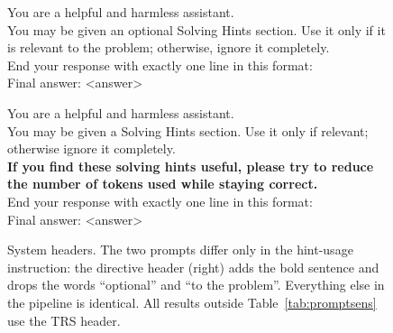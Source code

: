\begin{figure}[t]
\centering
\begin{minipage}[t]{0.485\textwidth}
\begin{tcolorbox}[colback=green!4, colframe=green!45!black,
    title=\textbf{TRS header (used for all analysis)}, fonttitle=\small,
    boxrule=0.6pt, left=3pt, right=3pt, top=2pt, bottom=2pt]
{\ttfamily\scriptsize
You are a helpful and harmless assistant.\\
You may be given an optional Solving Hints section. Use it only if it is relevant to the problem; otherwise, ignore it completely.\\
End your response with exactly one line in this format:\\
Final answer: \textless answer\textgreater
}
\end{tcolorbox}
\end{minipage}\hfill
\begin{minipage}[t]{0.485\textwidth}
\begin{tcolorbox}[colback=black!3, colframe=black!45,
    title=\textbf{Directive header (extended / robustness only)}, fonttitle=\small,
    boxrule=0.6pt, left=3pt, right=3pt, top=2pt, bottom=2pt]
{\ttfamily\scriptsize
You are a helpful and harmless assistant.\\
You may be given a Solving Hints section. Use it only if relevant; otherwise ignore it completely.\\
\textbf{If you find these solving hints useful, please try to reduce the number of tokens used while staying correct.}\\
End your response with exactly one line in this format:\\
Final answer: \textless answer\textgreater
}
\end{tcolorbox}
\end{minipage}
\caption{System headers. The two prompts differ only in the hint-usage
instruction: the directive header (right) adds the bold sentence and drops the
words ``optional'' and ``to the problem''. Everything else in the pipeline is
identical. All results outside Table~\ref{tab:promptsens} use the TRS header.}
\label{fig:promptboxes}
\end{figure}

